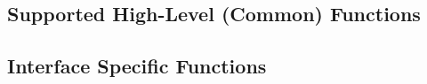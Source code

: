 \documentclass[12pt]{report} %
\providecommand{\DIFdelend}{} %
\DeclareRobustCommand{\DIFdelend}{\DIFOaddend \let\includegraphics\DIFOincludegraphics} %
\begin{document}

\DIFdelend %

\subsection{Supported High-Level (Common) Functions}\label{sec:MgrRMHighLevel}


\subsection{Interface Specific Functions}\label{sec:MgrRMFunctions}
\end{document}
